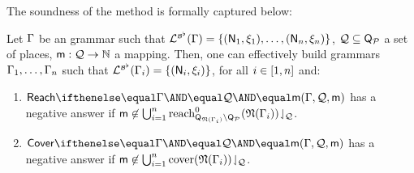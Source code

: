 The soundness of the method is formally captured below:

\begin{theoremE}[][category=proofs]\label{thm:soundness}
  Let $\Gamma$ be an \hrtext{} grammar such that
  $\mathcal{L}_{}^{\scriptscriptstyle{{\mathcal{B}}^\flat}}({\Gamma})={\{ {(\mathsf{N}_1,\xi_1),
    \ldots, (\mathsf{N}_n,\xi_n)} \}}$, $\mathcal{Q} \subseteq
  \mathsf{Q}_{\mathcal{P}}$ a set of places, $\mathsf{m} : \mathcal{Q}
  \rightarrow \mathbb{N}$ a mapping. Then, one can effectively build
  grammars $\Gamma_1,\ldots,\Gamma_n$ such that
  $\mathcal{L}_{}^{\scriptscriptstyle{{\mathcal{B}}^\flat}}({\Gamma_i})={\{ {(\mathsf{N}_i,\xi_i)} \}}$,
  for all $i\in{[{1},{n}]}$ and:
  \begin{enumerate}
  \item\label{it1:thm:soundness}
    $\paramreach{\grammar}{\mathcal{Q}}{\amark}$ has a negative answer
    if
    $\mathsf{m}\not\in\bigcup_{i=1}^n{\mathrm{reach}^0_{\mathsf{Q}_{\mathfrak{N}({\Gamma_i})}
        \setminus
        \mathsf{Q}_{\mathcal{P}}}({\mathfrak{N}({\Gamma_i})})}\!\downharpoonleft_{\mathcal{Q}}$.
  \item\label{it2:thm:soundness}
    $\paramcover{\grammar}{\mathcal{Q}}{\amark}$ has a negative answer
    if
    $\mathsf{m}\not\in\bigcup_{i=1}^n{\mathrm{cover}({\mathfrak{N}({\Gamma_i})})}\!\downharpoonleft_{\mathcal{Q}}$.
  \end{enumerate}
\end{theoremE}
